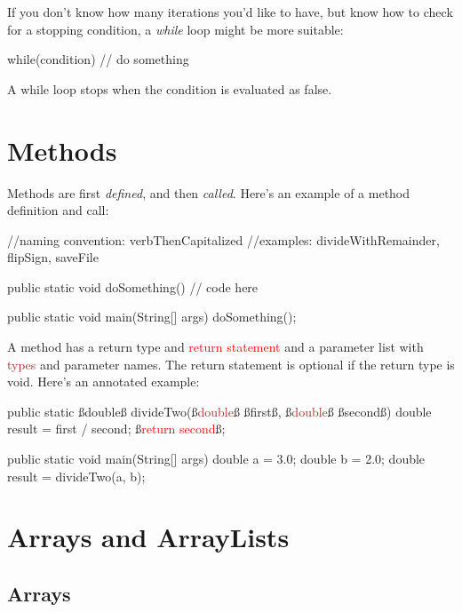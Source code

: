 If you don't know how many iterations you'd like to have, but know how to check for a stopping condition, a \textit{while} loop might be more suitable:

\begin{code}
while(condition){
    // do something
}
\end{code}

A while loop stops when the condition is evaluated as false. 

\section{Methods}

Methods are first \textit{defined}, and then \textit{called}. Here's an example of a method definition and call:

\begin{code}
//naming convention: verbThenCapitalized
//examples: divideWithRemainder, flipSign, saveFile

public static void doSomething() {
    // code here
}

public static void main(String[] args) {
doSomething();
}
\end{code}

A method has a \textcolor{mygreen}{return type} and \textcolor{red}{return statement} and a parameter list with \textcolor{Brown}{types} and \textcolor{Rhodamine}{parameter names}. The return statement is optional if the return type is void. Here's an annotated example:

\begin{code}

public static ß\textcolor{mygreen}{double}ß divideTwo(ß\textcolor{Brown}{double}ß ß\textcolor{Rhodamine}{first}ß, ß\textcolor{Brown}{double}ß ß\textcolor{Rhodamine}{second}ß) {
    double result = first / second;
    ß\textcolor{red}{return second}ß;
}

public static void main(String[] args) {
    double a = 3.0;
    double b = 2.0;
    double result = divideTwo(a, b);
}

\end{code}

\section{Arrays and ArrayLists}

\subsection{Arrays}

